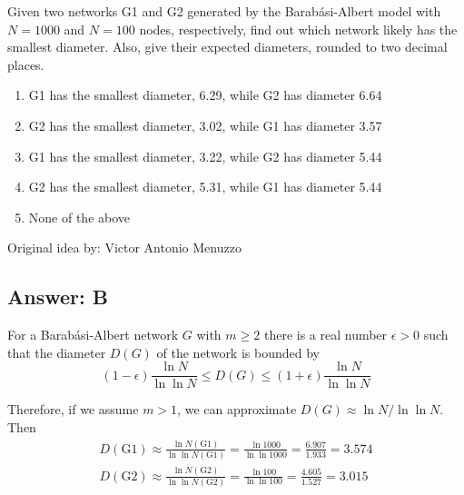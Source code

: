 
Given two networks G1 and G2 generated by the Barabási-Albert model with $N = 1000$ and $N = 100$ nodes, respectively, find out which network likely has the smallest diameter. Also, give their expected diameters, rounded to two decimal places.

\begin{enumerate}[label={\Alph*.}]
    \item G1 has the smallest diameter, 6.29, while G2 has diameter 6.64
    \item G2 has the smallest diameter, 3.02, while G1 has diameter 3.57
    \item G1 has the smallest diameter, 3.22, while G2 has diameter 5.44
    \item G2 has the smallest diameter, 5.31, while G1 has diameter 5.44
    \item None of the above
\end{enumerate}

Original idea by: Victor Antonio Menuzzo


\subsection*{Answer: B}

For a Barabási-Albert network $G$ with $m \geq 2$ there is a real number $\epsilon > 0$ such that the diameter $D(G)$ of the network is bounded by \[
    (1 - \epsilon) \frac{\ln N}{\ln \ln N} \leq D(G) \leq (1 + \epsilon) \frac{\ln N}{\ln \ln N}
\] \cite{diameter}

Therefore, if we assume $m > 1$, we can approximate $D(G) \approx \ln N / \ln \ln N$. Then
\begin{gather*}
    D(\text{G1})
        \approx \frac{\ln N(\text{G1})}{\ln \ln N(\text{G1})}
        = \frac{\ln 1000}{\ln \ln 1000}
        = \frac{6.907}{1.933}
        = 3.574
    \\
    D(\text{G2})
        \approx \frac{\ln N(\text{G2})}{\ln \ln N(\text{G2})}
        = \frac{\ln 100}{\ln \ln 100}
        = \frac{4.605}{1.527}
        = 3.015
\end{gather*}
